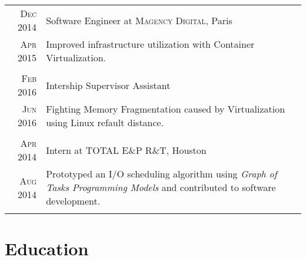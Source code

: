 \documentclass[a4paper,10pt]{article} %
\begin{document}
\begin{tabular}{r|p{11cm}}


\textsc{Dec 2014} & Software Engineer at \textsc{Magency Digital}, Paris\\
\textsc{Apr 2015} & \footnotesize{
                        Improved infrastructure utilization with Container Virtualization.
					}\\
\multicolumn{2}{c}{} \\


\textsc{Feb 2016} & Intership Supervisor Assistant\\
\textsc{Jun 2016} & \footnotesize{Fighting Memory Fragmentation caused by Virtualization using Linux refault distance.}\\
\multicolumn{2}{c}{} \\


\textsc{Apr 2014} & Intern at \textsc{TOTAL E\&P R\&T}, Houston\\
\textsc{Aug 2014} & \footnotesize{
						Prototyped an I/O scheduling algorithm using \emph{Graph of Tasks Programming Models} and contributed to software development.
					}\\
\multicolumn{2}{c}{} \\



\end{tabular}


\section{Education}
\end{document}
